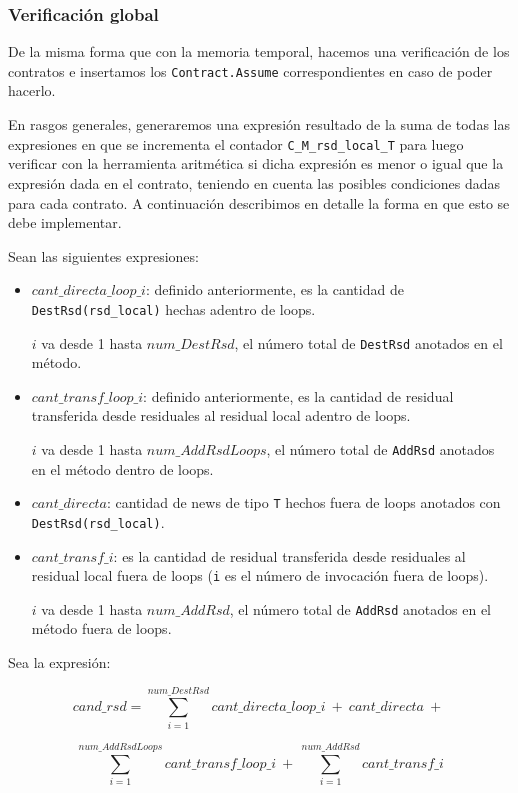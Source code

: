 \documentclass[12pt,a4paper]{article}
\newcommand\mono[1]{\texttt{#1}}
\begin{document}
			\subsubsection{Verificación global}
				De la misma forma que con la memoria temporal, hacemos una verificación de los contratos e insertamos los \mono{Contract.Assume} correspondientes en caso de poder hacerlo.

				En rasgos generales, generaremos una expresión resultado de la suma de todas las expresiones en que se incrementa el contador \mono{C\_M\_rsd\_local\_T} para luego verificar con la herramienta aritmética si dicha expresión es menor o igual que la expresión dada en el contrato, teniendo en cuenta las posibles condiciones dadas para cada contrato. A continuación describimos en detalle la forma en que esto se debe implementar.

				Sean las siguientes expresiones:
				\begin{itemize}
					\item
						$cant\_directa\_loop\_i$: definido anteriormente, es la cantidad de \\ \mono{DestRsd(rsd\_local)} hechas adentro de loops.

						$i$ va desde 1 hasta $num\_DestRsd$, el número total de \mono{DestRsd} anotados en el método.
					\item
						$cant\_transf\_loop\_i$: definido anteriormente, es la cantidad de residual transferida desde residuales al residual local adentro de loops.

						$i$ va desde 1 hasta $num\_AddRsdLoops$, el número total de \mono{AddRsd} anotados en el método dentro de loops.
					\item
						$cant\_directa$: cantidad de news de tipo \mono{T} hechos fuera de loops anotados con \mono{DestRsd(rsd\_local)}.
					\item
						$cant\_transf\_i$: es la cantidad de residual transferida desde residuales al residual local fuera de loops (\mono{i} es el número de invocación fuera de loops).

						$i$ va desde 1 hasta $num\_AddRsd$, el número total de \mono{AddRsd} anotados en el método fuera de loops.
				\end{itemize}
				
				Sea la expresión:

					$$cand\_rsd = \sum_{i=1}^{num\_DestRsd}{cant\_directa\_loop\_i}\ +\ cant\_directa\ +\ $$

					$$\sum_{i=1}^{num\_AddRsdLoops}{cant\_transf\_loop\_i}\ +\ \sum_{i=1}^{num\_AddRsd}{cant\_transf\_i}$$
\end{document}
